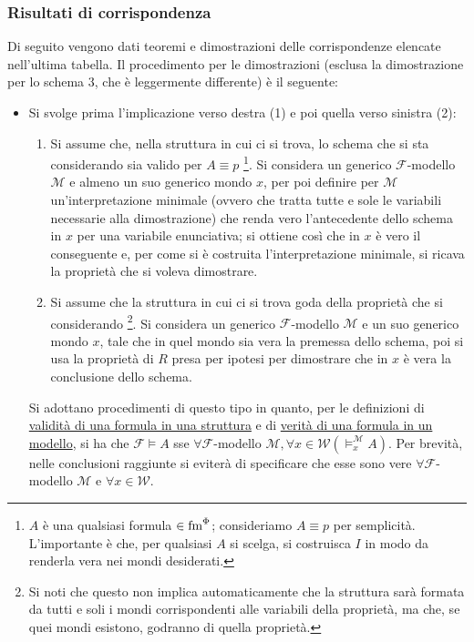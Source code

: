 \documentclass[a4paper,12pt]{article}
\newcommand{\latinmodern}[1]{\text{#1}}
\newcommand{\latinmath}[1]{\text{\latinmodern{#1}}} %
\begin{document}
\vspace{12pt}
\subsubsection{Risultati di corrispondenza}
\noindent Di seguito vengono dati teoremi e dimostrazioni delle corrispondenze elencate nell'ultima tabella. Il procedimento per le dimostrazioni (esclusa la dimostrazione per lo schema $3$, che è leggermente differente) è il seguente:
\begin{itemize}
	\item Si svolge prima l'implicazione verso destra (1) e poi quella verso sinistra (2):
	      \begin{enumerate}
		      \item Si assume che, nella struttura in cui ci si trova, lo schema che si sta considerando sia valido per $A \equiv p$ \footnote{$A$ è una qualsiasi formula $\in \latinmath{fm}^{\Phi}$; consideriamo $A \equiv p$ per semplicità. L'importante è che, per qualsiasi $A$ si scelga, si costruisca $I$ in modo da renderla vera nei mondi desiderati.}. Si considera un generico $\mathcal{F}$-modello $\mathcal{M}$ e almeno un suo generico mondo $x$, per poi definire per $\mathcal{M}$ un'interpretazione minimale (ovvero che tratta tutte e sole le variabili necessarie alla dimostrazione) che renda vero l'antecedente dello schema in $x$ per una variabile enunciativa; si ottiene così che in $x$ è vero il conseguente e, per come si è costruita l'interpretazione minimale, si ricava la proprietà che si voleva dimostrare.
		      \item Si assume che la struttura in cui ci si trova goda della proprietà che si considerando \footnote{Si noti che questo non implica automaticamente che la struttura sarà formata da tutti e soli i mondi corrispondenti alle variabili della proprietà, ma che, se quei mondi esistono, godranno di quella proprietà.}. Si considera un generico $\mathcal{F}$-modello $\mathcal{M}$ e un suo generico mondo $x$, tale che in quel mondo sia vera la premessa dello schema, poi si usa la proprietà di $R$ presa per ipotesi per dimostrare che in $x$ è vera la conclusione dello schema.
	      \end{enumerate}
	      Si adottano procedimenti di questo tipo in quanto, per le definizioni di \hyperlink{valstrut}{validità di una formula in una struttura} e di \hyperlink{vermod}{verità di una formula in un modello}, si ha che $\mathcal{F} \vDash A$ sse $\forall \mathcal{F}$-modello $\mathcal{M}, \forall x \in \mathcal{W} (\vDash_{x}^{\mathcal{M}} A)$. Per brevità, nelle conclusioni raggiunte si eviterà di specificare che esse sono vere $\forall \mathcal{F}$-modello $\mathcal{M}$ e $\forall x \in \mathcal{W}$. \\
\end{itemize}
\end{document}
